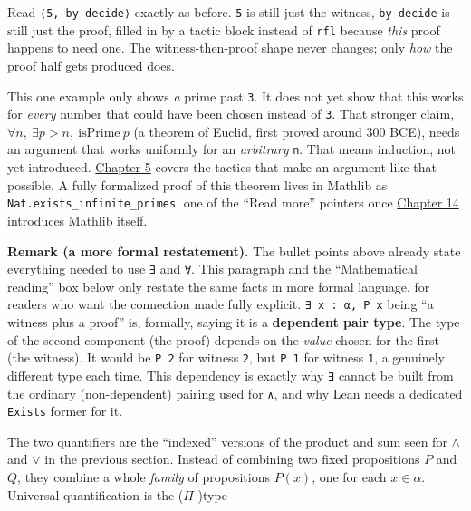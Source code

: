 Read \texttt{⟨5, by decide⟩} exactly as before. \texttt{5} is still just the witness, \texttt{by decide} is still just the proof, filled in by a tactic block instead of \texttt{rfl} because \emph{this} proof happens to need one. The witness-then-proof shape never changes; only \emph{how} the proof half gets produced does.

This one example only shows \emph{a} prime past \texttt{3}. It does not yet show that this works for \emph{every} number that could have been chosen instead of \texttt{3}. That stronger claim, \(\forall n,\ \exists p > n,\ \mathrm{isPrime}\ p\) (a theorem of Euclid, first proved around 300 BCE), needs an argument that works uniformly for an \emph{arbitrary} \texttt{n}. That means induction, not yet introduced. \hyperref[sec:05-tactics:00-index:1]{Chapter 5} covers the tactics that make an argument like that possible. A fully formalized proof of this theorem lives in Mathlib as \texttt{Nat.exists\_\allowbreak{}infinite\_\allowbreak{}primes}, one of the ``Read more'' pointers once \hyperref[sec:14-next-steps:00-index:1]{Chapter 14} introduces Mathlib itself.

\textbf{Remark (a more formal restatement).} The bullet points above already state everything needed to use \texttt{∃} and \texttt{∀}. This paragraph and the ``Mathematical reading'' box below only restate the same facts in more formal language, for readers who want the connection made fully explicit. \texttt{∃ x : α, P x} being ``a witness plus a proof'' is, formally, saying it is a \textbf{dependent pair type}. The type of the second component (the proof) depends on the \emph{value} chosen for the first (the witness). It would be \texttt{P 2} for witness \texttt{2}, but \texttt{P 1} for witness \texttt{1}, a genuinely different type each time. This dependency is exactly why \texttt{∃} cannot be built from the ordinary (non-dependent) pairing used for \texttt{∧}, and why Lean needs a dedicated \texttt{Exists} former for it.

\begin{mathreading}

The two quantifiers are the ``indexed'' versions of the product and sum seen for \(\wedge\) and \(\vee\) in the previous section. Instead of combining two fixed propositions \(P\) and \(Q\), they combine a whole \emph{family} of propositions \(P(x)\), one for each \(x \in \alpha\). Universal quantification is the (\(\Pi\)-)type

\end{mathreading}

